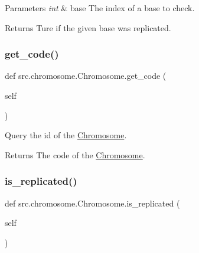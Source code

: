 \begin{DoxyParams}{Parameters}
{\em int} & base The index of a base to check. \\
\hline
\end{DoxyParams}
\begin{DoxyReturn}{Returns}
Ture if the given base was replicated. 
\end{DoxyReturn}
\mbox{\label{classsrc_1_1chromosome_1_1Chromosome_ab718a539f93dd0b2d7d5d299de3d9532}} 
\subsubsection{\texorpdfstring{get\+\_\+code()}{get\_code()}}
{\footnotesize\ttfamily def src.\+chromosome.\+Chromosome.\+get\+\_\+code (\begin{DoxyParamCaption}\item[{}]{self }\end{DoxyParamCaption})}



Query the id of the \mbox{\hyperlink{classsrc_1_1chromosome_1_1Chromosome}{Chromosome}}. 

\begin{DoxyReturn}{Returns}
The code of the \mbox{\hyperlink{classsrc_1_1chromosome_1_1Chromosome}{Chromosome}}. 
\end{DoxyReturn}
\mbox{\label{classsrc_1_1chromosome_1_1Chromosome_a75f3d66aaaf16d67ebdfe03d6eff9d80}} 
\subsubsection{\texorpdfstring{is\+\_\+replicated()}{is\_replicated()}}
{\footnotesize\ttfamily def src.\+chromosome.\+Chromosome.\+is\+\_\+replicated (\begin{DoxyParamCaption}\item[{}]{self }\end{DoxyParamCaption})}



